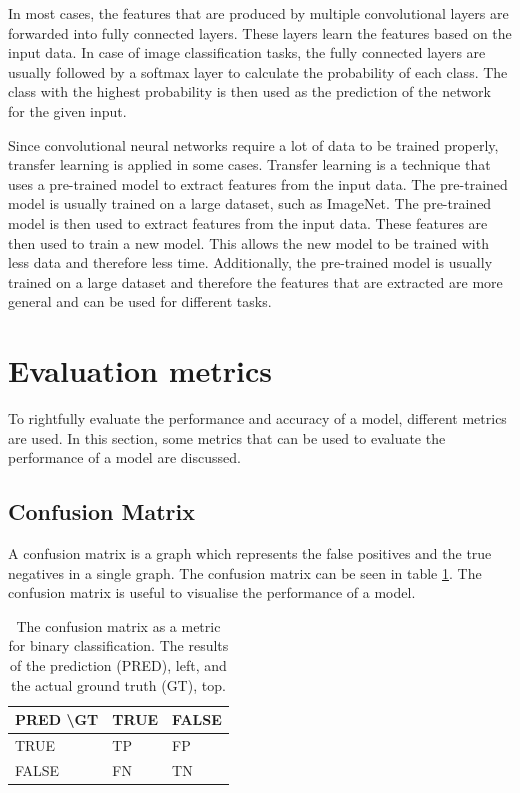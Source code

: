 In most cases, the features that are produced by multiple convolutional layers are forwarded into fully connected layers. These layers learn the features based on the input data. In case of image classification tasks, the fully connected layers are usually followed by a softmax layer to calculate the probability of each class. The class with the highest probability is then used as the prediction of the network for the given input.

Since convolutional neural networks require a lot of data to be trained properly, transfer learning is applied in some cases. Transfer learning is a technique that uses a pre-trained model to extract features from the input data. The pre-trained model is usually trained on a large dataset, such as ImageNet\cite{ImageNet}. The pre-trained model is then used to extract features from the input data. These features are then used to train a new model. This allows the new model to be trained with less data and therefore less time. Additionally, the pre-trained model is usually trained on a large dataset and therefore the features that are extracted are more general and can be used for different tasks. 

\section{Evaluation metrics}

To rightfully evaluate the performance and accuracy of a model, different metrics are used. In this section, some metrics that can be used to evaluate the performance of a model are discussed.

\subsection{Confusion Matrix}

A confusion matrix is a graph which represents the false positives and the true negatives in a single graph. The confusion matrix can be seen in table \ref{tab:confusion_matrix}. The confusion matrix is useful to visualise the performance of a model.

\begin{table}[ht]
    \caption[The Confusion Matrix]{The confusion matrix as a metric for binary classification. The results of the prediction (PRED), left, and the actual ground truth (GT), top.}
    \label{tab:confusion_matrix}
    \centering
    \begin{tabular}{l|ll}
    PRED \textbackslash GT & TRUE & FALSE \\ \hline
    TRUE                   & TP   & FP    \\
    FALSE                  & FN   & TN   
    \end{tabular}
\end{table}

